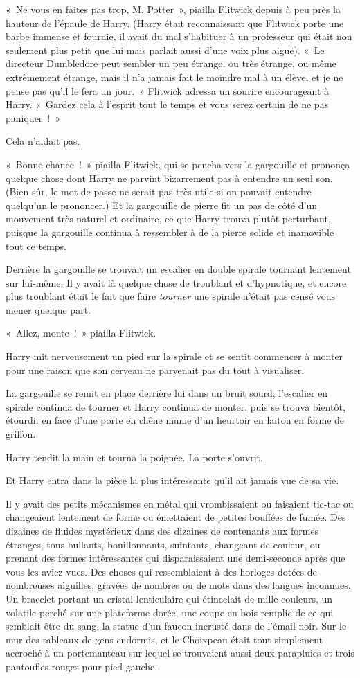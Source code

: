 «~Ne vous en faites pas trop, M. Potter~», piailla Flitwick depuis à peu près la hauteur de l'épaule de Harry.
(Harry était reconnaissant que Flitwick porte une barbe immense et fournie, il avait du mal s'habituer à un professeur qui était non seulement plus petit que lui mais parlait aussi d'une voix plus aiguë).
«~Le directeur Dumbledore peut sembler un peu étrange, ou très étrange, ou même extrêmement étrange, mais il n'a jamais fait le moindre mal à un élève, et je ne pense pas qu'il le fera un jour.~»
Flitwick adressa un sourire encourageant à Harry.
«~Gardez cela à l'esprit tout le temps et vous serez certain de ne pas paniquer~!~»

Cela n'aidait pas.

«~Bonne chance~!~»
piailla Flitwick, qui se pencha vers la gargouille et prononça quelque chose dont Harry ne parvint bizarrement pas à entendre un seul son.
(Bien sûr, le mot de passe ne serait pas très utile si on pouvait entendre quelqu'un le prononcer.)
Et la gargouille de pierre fit un pas de côté d'un mouvement très naturel et ordinaire, ce que Harry trouva plutôt perturbant, puisque la gargouille continua à ressembler à de la pierre solide et inamovible tout ce temps.

Derrière la gargouille se trouvait un escalier en double spirale tournant lentement sur lui-même.
Il y avait là quelque chose de troublant et d'hypnotique, et encore plus troublant était le fait que faire \emph{tourner} une spirale n'était pas censé vous mener quelque part.

«~Allez, monte~!~»
piailla Flitwick.

Harry mit nerveusement un pied sur la spirale et se sentit commencer à monter pour une raison que son cerveau ne parvenait pas du tout à visualiser.

La gargouille se remit en place derrière lui dans un bruit sourd, l'escalier en spirale continua de tourner et Harry continua de monter, puis se trouva bientôt, étourdi, en face d'une porte en chêne munie d'un heurtoir en laiton en forme de griffon.

Harry tendit la main et tourna la poignée.
La porte s'ouvrit.

Et Harry entra dans la pièce la plus intéressante qu'il ait jamais vue de sa vie.

Il y avait des petits mécanismes en métal qui vrombissaient ou faisaient tic-tac ou changeaient lentement de forme ou émettaient de petites bouffées de fumée.
Des dizaines de fluides mystérieux dans des dizaines de contenants aux formes étranges, tous bullants, bouillonnants, suintants, changeant de couleur, ou prenant des formes intéressantes qui disparaissaient une demi-seconde après que vous les aviez vues.
Des choses qui ressemblaient à des horloges dotées de nombreuses aiguilles, gravées de nombres ou de mots dans des langues inconnues.
Un bracelet portant un cristal lenticulaire qui étincelait de mille couleurs, un volatile perché sur une plateforme dorée, une coupe en bois remplie de ce qui semblait être du sang, la statue d'un faucon incrusté dans de l'émail noir.
Sur le mur des tableaux de gens endormis, et le Choixpeau était tout simplement accroché à un portemanteau sur lequel se trouvaient aussi deux parapluies et trois pantoufles rouges pour pied gauche.

